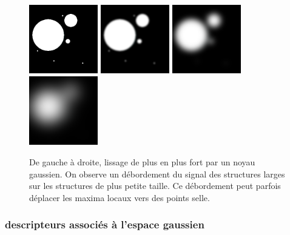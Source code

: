 \begin{figure}[!ht]
  \centering
  \includegraphics[height=3cm]{Images/gaussian_spilling_init.png}
  \includegraphics[height=3cm]{Images/gaussian_spilling_g10.png}
  \includegraphics[height=3cm]{Images/gaussian_spilling_g40.png}
  \includegraphics[height=3cm]{Images/gaussian_spilling_g100.png}
  \caption{De gauche à droite, lissage de plus en plus fort par un noyau gaussien. On observe un débordement du signal des structures larges sur les structures de plus petite taille. Ce débordement peut parfois déplacer les maxima locaux vers des points selle.}
  \label{fig:scale_space_spilling}
\end{figure}


\subsubsection{descripteurs associés à l'espace gaussien}
\label{sec:EA:rehaussement:hessienne}

